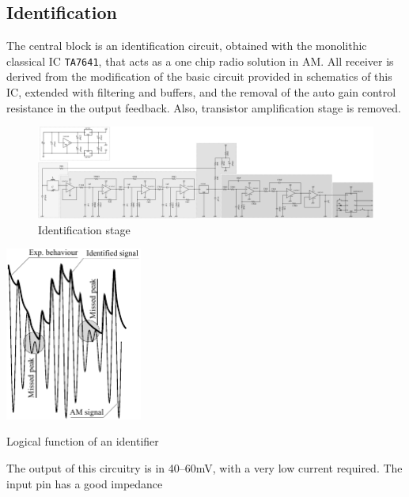 \subsection{Identification}
The central block is an identification circuit, obtained with the monolithic classical IC \texttt{TA7641},  that acts as a one chip radio solution in AM. All receiver is derived from the modification of the basic circuit provided in schematics of this IC, extended with filtering and buffers, and the removal of the auto gain control resistance in the output feedback. Also, transistor amplification stage is removed.
\begin{figure}[h]
	\centering
	\includegraphics*[viewport=1251 3 1580 595,scale=0.4]{ch2/img/receiver3.pdf}
	\caption{Identification stage}
	\label{fig:identifier}
\end{figure}
\begin{marginfigure}
	\centering
	\includegraphics[width=4.5cm]{ch2/img/identificatore.pdf}
	\caption{Logical function of an identifier}
	\label{fig:identifier_log}
\end{marginfigure}
 The output of this circuitry is in \numrange{40}{60}\si{\milli\volt}, with a very low current required. The input pin has a good impedance 

